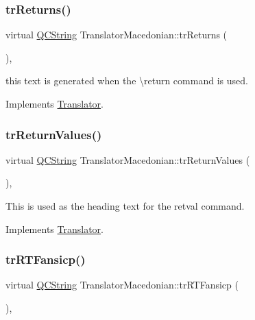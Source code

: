\subsubsection{\texorpdfstring{trReturns()}{trReturns()}}
{\footnotesize\ttfamily virtual \mbox{\hyperlink{class_q_c_string}{Q\+C\+String}} Translator\+Macedonian\+::tr\+Returns (\begin{DoxyParamCaption}{ }\end{DoxyParamCaption})\hspace{0.3cm}{\ttfamily [inline]}, {\ttfamily [virtual]}}

this text is generated when the \textbackslash{}return command is used. 

Implements \mbox{\hyperlink{class_translator}{Translator}}.

\mbox{\label{class_translator_macedonian_a50aa25bf300f2333ca0bf8149154d2e6}} 
\subsubsection{\texorpdfstring{trReturnValues()}{trReturnValues()}}
{\footnotesize\ttfamily virtual \mbox{\hyperlink{class_q_c_string}{Q\+C\+String}} Translator\+Macedonian\+::tr\+Return\+Values (\begin{DoxyParamCaption}{ }\end{DoxyParamCaption})\hspace{0.3cm}{\ttfamily [inline]}, {\ttfamily [virtual]}}

This is used as the heading text for the retval command. 

Implements \mbox{\hyperlink{class_translator}{Translator}}.

\mbox{\label{class_translator_macedonian_aeabb5a992e4d426dde01bb32a89755dc}} 
\subsubsection{\texorpdfstring{trRTFansicp()}{trRTFansicp()}}
{\footnotesize\ttfamily virtual \mbox{\hyperlink{class_q_c_string}{Q\+C\+String}} Translator\+Macedonian\+::tr\+R\+T\+Fansicp (\begin{DoxyParamCaption}{ }\end{DoxyParamCaption})\hspace{0.3cm}{\ttfamily [inline]}, {\ttfamily [virtual]}}

